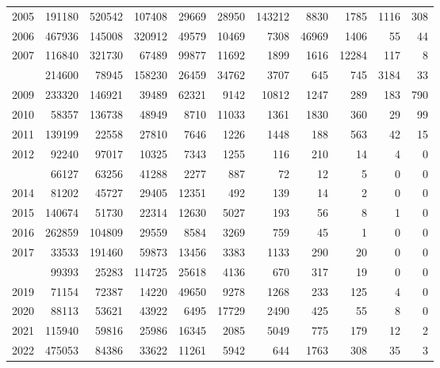 \documentclass[
]{article}
\begin{document}
\begin{longtable}[t]{lrrrrrrrrrr}
2005 & 191180 & 520542 & 107408 & 29669 & 28950 & 143212 & 8830 & 1785 & 1116 & 308\\
2006 & 467936 & 145008 & 320912 & 49579 & 10469 & 7308 & 46969 & 1406 & 55 & 44\\
2007 & 116840 & 321730 & 67489 & 99877 & 11692 & 1899 & 1616 & 12284 & 117 & 8\\
\addlinespace
2008 & 214600 & 78945 & 158230 & 26459 & 34762 & 3707 & 645 & 745 & 3184 & 33\\
2009 & 233320 & 146921 & 39489 & 62321 & 9142 & 10812 & 1247 & 289 & 183 & 790\\
2010 & 58357 & 136738 & 48949 & 8710 & 11033 & 1361 & 1830 & 360 & 29 & 99\\
2011 & 139199 & 22558 & 27810 & 7646 & 1226 & 1448 & 188 & 563 & 42 & 15\\
2012 & 92240 & 97017 & 10325 & 7343 & 1255 & 116 & 210 & 14 & 4 & 0\\
\addlinespace
2013 & 66127 & 63256 & 41288 & 2277 & 887 & 72 & 12 & 5 & 0 & 0\\
2014 & 81202 & 45727 & 29405 & 12351 & 492 & 139 & 14 & 2 & 0 & 0\\
2015 & 140674 & 51730 & 22314 & 12630 & 5027 & 193 & 56 & 8 & 1 & 0\\
2016 & 262859 & 104809 & 29559 & 8584 & 3269 & 759 & 45 & 1 & 0 & 0\\
2017 & 33533 & 191460 & 59873 & 13456 & 3383 & 1133 & 290 & 20 & 0 & 0\\
\addlinespace
2018 & 99393 & 25283 & 114725 & 25618 & 4136 & 670 & 317 & 19 & 0 & 0\\
2019 & 71154 & 72387 & 14220 & 49650 & 9278 & 1268 & 233 & 125 & 4 & 0\\
2020 & 88113 & 53621 & 43922 & 6495 & 17729 & 2490 & 425 & 55 & 8 & 0\\
2021 & 115940 & 59816 & 25986 & 16345 & 2085 & 5049 & 775 & 179 & 12 & 2\\
2022 & 475053 & 84386 & 33622 & 11261 & 5942 & 644 & 1763 & 308 & 35 & 3\\*
\end{longtable}
\end{document}
